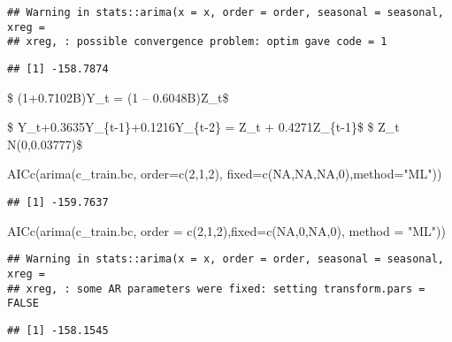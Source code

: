 \documentclass[
]{article}
\newenvironment{Shaded}{\begin{snugshade}}{\end{snugshade}}
\newcommand{\AttributeTok}[1]{\textcolor[rgb]{0.77,0.63,0.00}{#1}}
\newcommand{\ConstantTok}[1]{\textcolor[rgb]{0.00,0.00,0.00}{#1}}
\newcommand{\DecValTok}[1]{\textcolor[rgb]{0.00,0.00,0.81}{#1}}
\newcommand{\FunctionTok}[1]{\textcolor[rgb]{0.00,0.00,0.00}{#1}}
\newcommand{\NormalTok}[1]{#1}
\newcommand{\StringTok}[1]{\textcolor[rgb]{0.31,0.60,0.02}{#1}}
\begin{document}
\begin{verbatim}
## Warning in stats::arima(x = x, order = order, seasonal = seasonal, xreg =
## xreg, : possible convergence problem: optim gave code = 1
\end{verbatim}

\begin{verbatim}
## [1] -158.7874
\end{verbatim}

\$ (1+0.7102B)Y\_t = (1 -- 0.6048B)Z\_t\$

\$ Y\_t+0.3635Y\_\{t-1\}+0.1216Y\_\{t-2\} = Z\_t + 0.4271Z\_\{t-1\}\$ \$
Z\_t N(0,0.03777)\$

\begin{Shaded}
\begin{Highlighting}[]
\FunctionTok{AICc}\NormalTok{(}\FunctionTok{arima}\NormalTok{(c\_train.bc, }\AttributeTok{order=}\FunctionTok{c}\NormalTok{(}\DecValTok{2}\NormalTok{,}\DecValTok{1}\NormalTok{,}\DecValTok{2}\NormalTok{), }\AttributeTok{fixed=}\FunctionTok{c}\NormalTok{(}\ConstantTok{NA}\NormalTok{,}\ConstantTok{NA}\NormalTok{,}\ConstantTok{NA}\NormalTok{,}\DecValTok{0}\NormalTok{),}\AttributeTok{method=}\StringTok{"ML"}\NormalTok{)) }
\end{Highlighting}
\end{Shaded}

\begin{verbatim}
## [1] -159.7637
\end{verbatim}

\begin{Shaded}
\begin{Highlighting}[]
\FunctionTok{AICc}\NormalTok{(}\FunctionTok{arima}\NormalTok{(c\_train.bc, }\AttributeTok{order =} \FunctionTok{c}\NormalTok{(}\DecValTok{2}\NormalTok{,}\DecValTok{1}\NormalTok{,}\DecValTok{2}\NormalTok{),}\AttributeTok{fixed=}\FunctionTok{c}\NormalTok{(}\ConstantTok{NA}\NormalTok{,}\DecValTok{0}\NormalTok{,}\ConstantTok{NA}\NormalTok{,}\DecValTok{0}\NormalTok{), }\AttributeTok{method =} \StringTok{"ML"}\NormalTok{))}
\end{Highlighting}
\end{Shaded}

\begin{verbatim}
## Warning in stats::arima(x = x, order = order, seasonal = seasonal, xreg =
## xreg, : some AR parameters were fixed: setting transform.pars = FALSE
\end{verbatim}

\begin{verbatim}
## [1] -158.1545
\end{verbatim}
\end{document}
